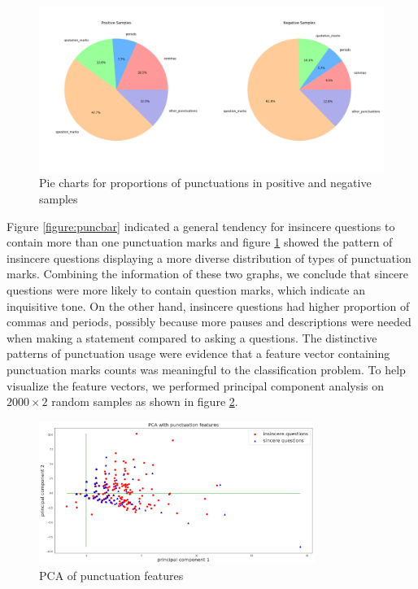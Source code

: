 \documentclass[12pt]{diazessay} %
\begin{document}
\begin{figure}[ht] 
    \includegraphics[width=\textwidth, center]{graphs/puncpiecharts.png}
    \caption{Pie charts for proportions of punctuations in positive and negative samples}
    \medskip
    \small
    \label{figure:puncpie}
\end{figure}


Figure \ref{figure:puncbar} indicated a general t{}endency for insincere questions to contain more than one punctuation marks and figure \ref{figure:puncpie} showed the pattern of insincere questions displaying a more diverse distribution of types of punctuation marks. Combining the information of these two graphs, we conclude that sincere questions were more likely to contain question marks, which indicate an inquisitive tone. On the other hand, insincere questions had higher proportion of commas and periods, possibly because more pauses and descriptions were needed when making a statement compared to asking a questions. The distinctive patterns of punctuation usage were evidence that a feature vector containing punctuation marks counts was meaningful to the classification problem. To help visualize the feature vectors, we performed principal component analysis on $2000 \times 2$ random samples as shown in figure \ref{figure:puncpca}.

\begin{figure}[ht]
    \includegraphics[width=0.8\textwidth, center]{graphs/pca/2Dpunc.png}
    
    \medskip
    \small
    \caption{PCA of punctuation features} 
    \label{figure:puncpca}
\end{figure}
\end{document}
